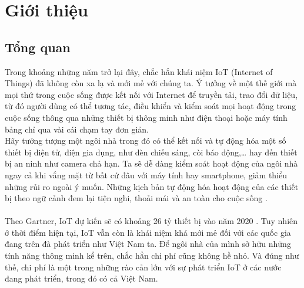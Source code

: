 \documentclass[12pt,a4paper,oneside]{extbook}
\begin{document}
\renewcommand{\listtablename}{Danh mục bảng}
\listoftables
{}

\renewcommand{\listfigurename}{Danh mục hình ảnh}
\listoffigures
{}

\mainmatter

\chapter{Giới thiệu}

\section{Tổng quan}
Trong khoảng những năm trở lại đây, chắc hẳn khái niệm IoT (Internet of Things) đã không còn xa lạ và mới mẻ với chúng ta. Ý tưởng về một thế giới mà mọi thứ trong cuộc sống được kết nối với Internet để truyền tải, trao đổi dữ liệu, từ đó người dùng có thể tương tác, điều khiển và kiểm soát mọi hoạt động trong cuộc sống thông qua những thiết bị thông minh như điện thoại hoặc máy tính bảng chỉ qua vài cái chạm tay đơn giản.\\

\noindent
Hãy tưởng tượng một ngôi nhà trong đó có thể kết nối và tự động hóa một số thiết bị điện tử, điện gia dụng, như đèn chiếu sáng, còi báo động,\dots\hspace{0mm} hay đến thiết bị an ninh như camera chả hạn. Ta sẽ dễ dàng kiểm soát hoạt động của ngôi nhà ngay cả khi vắng mặt từ bất cứ đâu với máy tính hay smartphone, giảm thiểu những rủi ro ngoài ý muốn. Những kịch bản tự động hóa hoạt động của các thiết bị theo ngữ cảnh đem lại tiện nghi, thoải mái và an toàn cho cuộc sống \cite{smarthome-trend}.\\\\
Theo Gartner, IoT dự kiến sẽ có khoảng 26 tỷ thiết bị vào năm 2020 \cite{gartner}. Tuy nhiên ở thời điểm hiện tại, IoT vẫn còn là khái niệm khá mới mẻ đối với các quốc gia đang trên đà phát triển như Việt Nam ta. Để ngôi nhà của mình sở hữu những tính năng thông minh kể trên, chắc hẳn chi phí cũng không hề nhỏ. Và đúng như thế, chi phí là một trong những rào cản lớn với sự phát triển IoT ở các nước đang phát triển, trong đó có cả Việt Nam.
\end{document}
